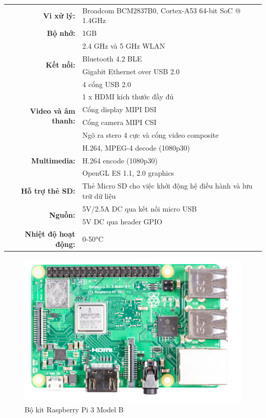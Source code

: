 { \centering
\begin{longtable}{rl}
\textbf{Vi xử lý:} & Broadcom BCM2837B0, Cortex-A53 64-bit SoC @ 1.4GHz \\
\textbf{Bộ nhớ:} & 1GB \\
\multirow{4}{*}{\textbf{Kết nối:}} & 2.4 GHz và 5 GHz WLAN \\
 & Bluetooth 4.2 BLE \\
 & Gigabit Ethernet over USB 2.0 \\
 & 4 cổng USB 2.0 \\
\multirow{4}{*}{\textbf{Video và âm thanh:}} & 1 x HDMI kích thước đầy đủ \\
 & Cổng display MIPI DSI \\
 & Cổng camera MIPI CSI \\
 & Ngõ ra stero 4 cực và cổng video composite \\
\multirow{3}{*}{\textbf{Multimedia:}} & H.264, MPEG-4 decode (1080p30) \\
 & H.264 encode (1080p30) \\
 & OpenGL ES 1.1, 2.0 graphics \\
\textbf{Hỗ trợ thẻ SD:} & Thẻ Micro SD cho việc khởi động hệ điều hành và lưu trữ dữ liệu \\
\multirow{2}{*}{\textbf{Nguồn:}} & 5V/2.5A DC qua kết nối micro USB \\
 & 5V DC qua header GPIO \\
\textbf{Nhiệt độ hoạt động:} & 0-50°C
\end{longtable}
}

\begin{figure}[H]
    \centering
    \includegraphics[width=0.75\linewidth]{../images/rpi3.png}
    \caption{Bộ kit Raspberry Pi 3 Model B}
\end{figure}